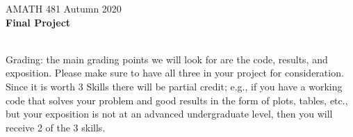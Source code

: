 \documentclass[11pt]{article}
\title{}
\begin{document}
\begin{center} AMATH 481 Autumn 2020 \\
\textbf{Final Project}\\[.3in]
\end{center}

\\

Grading:  the main grading points we will look for are the code, results, and exposition.  Please make sure to have all three in your project for consideration.  Since it is worth 3 Skills there will be partial credit; e.g., if you have a working code that solves your problem and good results in the form of plots, tables, etc., but your exposition is not at an advanced undergraduate level, then you will receive 2 of the 3 skills.\\
\end{document}
